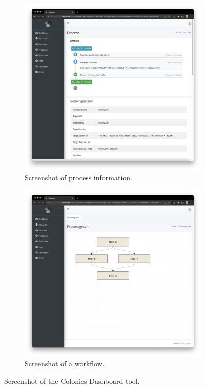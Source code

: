 \documentclass{article}
\begin{document}
\begin{figure}
     \centering
     \begin{subfigure}[b]{0.49\textwidth}
         \centering
         \includegraphics[scale=0.17]{dashboard1.png}
         \caption{Screenshot of process information.}
     	 \label{fig:dashboard1}
     \end{subfigure}
     \hfill
     \begin{subfigure}[b]{0.49\textwidth}
         \centering
         \includegraphics[scale=0.17]{dashboard2.png}
      	 \caption{Screenshot of a workflow.}
     \end{subfigure}
     \caption{Screenshot of the Colonies Dashboard tool.}
\end{figure}
\end{document}

